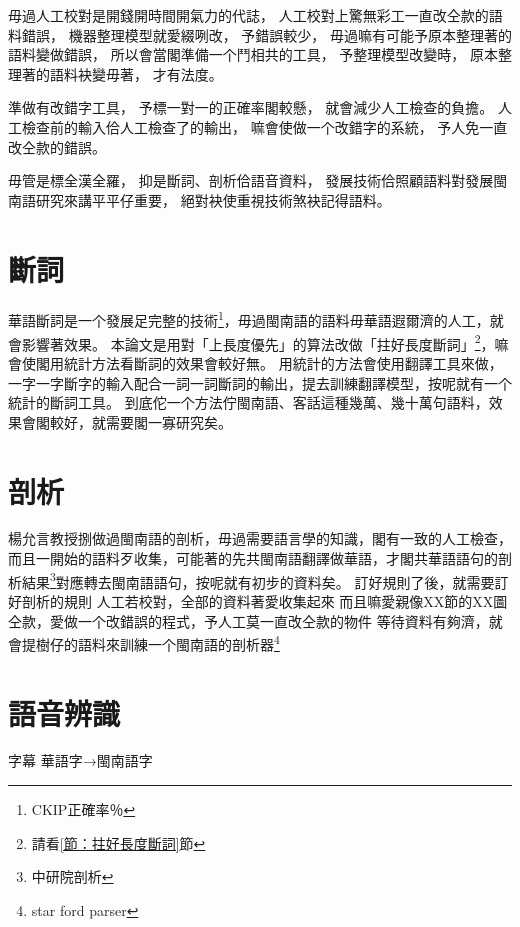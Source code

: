 

毋過人工校對是開錢開時間開氣力的代誌，
人工校對上驚無彩工一直改仝款的語料錯誤，
機器整理模型就愛綴咧改，
予錯誤較少，
毋過嘛有可能予原本整理著的語料變做錯誤，
所以會當閣準備一个鬥相共的工具，
予整理模型改變時，
原本整理著的語料袂變毋著，
才有法度。

準做有改錯字工具，
予標一對一的正確率閣較懸，
就會減少人工檢查的負擔。
人工檢查前的輸入佮人工檢查了的輸出，
嘛會使做一个改錯字的系統，
予人免一直改仝款的錯誤。

毋管是標全漢全羅，
抑是斷詞、剖析佮語音資料，
發展技術佮照顧語料對發展閩南語研究來講平平仔重要，
絕對袂使重視技術煞袂記得語料。


\section{斷詞}
\label{節：未來斷詞}
華語斷詞是一个發展足完整的技術\footnote{CKIP正確率％}，毋過閩南語的語料毋華語遐爾濟的人工，就會影響著效果。
本論文是用對「上長度優先」的算法改做「拄好長度斷詞」\footnote{請看\ref{節：拄好長度斷詞}節}，嘛會使閣用統計方法看斷詞的效果會較好無。
用統計的方法會使用翻譯工具來做，一字一字斷字的輸入配合一詞一詞斷詞的輸出，提去訓練翻譯模型，按呢就有一个統計的斷詞工具。
到底佗一个方法佇閩南語、客話這種幾萬、幾十萬句語料，效果會閣較好，就需要閣一寡研究矣。
\section{剖析}
\label{節：未來剖析}
楊允言教授捌做過閩南語的剖析，毋過需要語言學的知識，閣有一致的人工檢查，而且一開始的語料歹收集，可能著的先共閩南語翻譯做華語，才閣共華語語句的剖析結果\footnote{中研院剖析}對應轉去閩南語語句，按呢就有初步的資料矣。
訂好規則了後，就需要訂好剖析的規則
人工若校對，全部的資料著愛收集起來
而且嘛愛親像XX節的XX圖仝款，愛做一个改錯誤的程式，予人工莫一直改仝款的物件
等待資料有夠濟，就會提樹仔的語料來訓練一个閩南語的剖析器\footnote{star ford parser}


\section{語音辨識}
\label{節：未來辨識}
字幕 華語字→閩南語字